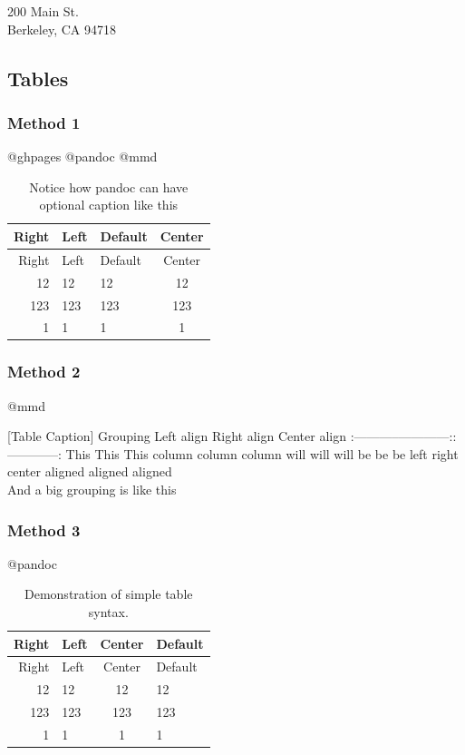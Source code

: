 \documentclass[]{article}
\begin{document}
200 Main St.\\
Berkeley, CA 94718

\subsection{Tables}\label{tables}

\subsubsection{Method 1}\label{method-1-2}

@ghpages @pandoc @mmd

\begin{longtable}[]{@{}rllc@{}}
\caption{Notice how pandoc can have optional caption like
this}\tabularnewline
\toprule
Right & Left & Default & Center\tabularnewline
\midrule
\endfirsthead
\toprule
Right & Left & Default & Center\tabularnewline
\midrule
\endhead
12 & 12 & 12 & 12\tabularnewline
123 & 123 & 123 & 123\tabularnewline
1 & 1 & 1 & 1\tabularnewline
\bottomrule
\end{longtable}

\subsubsection{Method 2}\label{method-2-2}

@mmd

{[}Table Caption{]} \textbar{} \textbar{} Grouping \textbar{}\textbar{}
\textbar{} Left align \textbar{} Right align \textbar{} Center align
\textbar{}
\textbar{}:-----------\textbar{}------------:\textbar{}:------------:\textbar{}
\textbar{} This \textbar{} This \textbar{} This \textbar{} \textbar{}
column \textbar{} column \textbar{} column \textbar{} \textbar{} will
\textbar{} will \textbar{} will \textbar{} \textbar{} be \textbar{} be
\textbar{} be \textbar{} \textbar{} left \textbar{} right \textbar{}
center \textbar{} \textbar{} aligned \textbar{} aligned \textbar{}
aligned \textbar{}\\
\textbar{} And a big grouping is like this
\textbar{}\textbar{}\textbar{}

\subsubsection{Method 3}\label{method-3-1}

@pandoc

\begin{longtable}[]{@{}rlcl@{}}
\caption{Demonstration of simple table syntax.}\tabularnewline
\toprule
Right & Left & Center & Default\tabularnewline
\midrule
\endfirsthead
\toprule
Right & Left & Center & Default\tabularnewline
\midrule
\endhead
12 & 12 & 12 & 12\tabularnewline
123 & 123 & 123 & 123\tabularnewline
1 & 1 & 1 & 1\tabularnewline
\bottomrule
\end{longtable}
\end{document}
